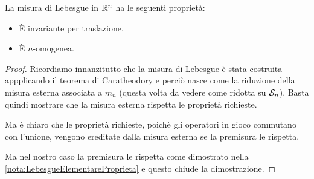 \begin{remark}\label{nota:LebesgueProprieta}
	La misura di Lebesgue in $\R^n$ ha le seguenti proprietà:
	\begin{itemize}
		\item È invariante per traslazione.
		\item È $n$-omogenea.
	\end{itemize}
\end{remark}
\begin{proof}
	Ricordiamo innanzitutto che la misura di Lebesgue è stata costruita appplicando il teorema di Caratheodory e perciò nasce come la riduzione della misura esterna associata a $m_n$ (questa volta da vedere come ridotta su $\S_n$). 
	Basta quindi mostrare che la misura esterna rispetta le proprietà richieste.
	
	Ma è chiaro che le proprietà richieste, poichè gli operatori in gioco commutano con l'unione, vengono ereditate dalla misura esterna se la premisura le rispetta.
	
	Ma nel nostro caso la premisura le rispetta come dimostrato nella \cref{nota:LebesgueElementareProprieta} e questo chiude la dimostrazione.
\end{proof}

